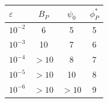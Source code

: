 \begin{tabular}{@{}lccc@{}}
\toprule
$\varepsilon$ & $B_P$ & $\psi_0$ & $\phi_P^*$\\
\midrule
$10^{-2}$ & 6 & 5 & 5\\
$10^{-3}$ & 10 & 7 & 6\\
$10^{-4}$ & $>10$ & 8 & 7\\
$10^{-5}$ & $>10$ & 10 & 8\\
$10^{-6}$ & $>10$ & $>10$ & 9\\
\bottomrule
\end{tabular}
